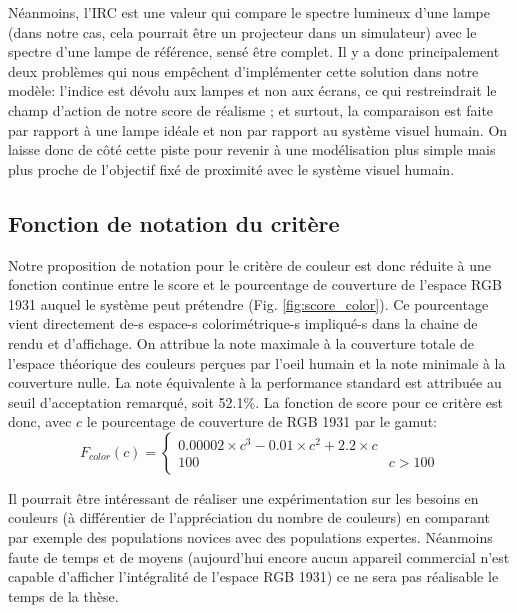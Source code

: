 	\par Néanmoins, l'IRC est une valeur qui compare le spectre lumineux d'une lampe (dans notre cas, cela pourrait être un projecteur dans un simulateur) avec le spectre d'une lampe de référence, sensé être complet. Il y a donc principalement deux problèmes qui nous empêchent d'implémenter cette solution dans notre modèle: l'indice est dévolu aux lampes et non aux écrans, ce qui restreindrait le champ d'action de notre score de réalisme ; et surtout, la comparaison est faite par rapport à une lampe idéale et non par rapport au système visuel humain. On laisse donc de côté cette piste pour revenir à une modélisation plus simple mais plus proche de l'objectif fixé de proximité avec le système visuel humain. 
	
	\subsection{Fonction de notation du critère}
	\par Notre proposition de notation pour le critère de couleur est donc réduite à une fonction continue entre le score et le pourcentage de couverture de l'espace RGB 1931 auquel le système peut prétendre (Fig. \ref{fig:score_color}). Ce pourcentage vient directement de-s espace-s colorimétrique-s impliqué-s dans la chaine de rendu et d'affichage. On attribue la note maximale à la couverture totale de l'espace théorique des couleurs perçues par l'oeil humain et la note minimale à la couverture nulle. La note équivalente à la performance standard est attribuée au seuil d'acceptation remarqué, soit 52.1\%. La fonction de score pour ce critère est donc, avec $c$ le pourcentage de couverture de RGB 1931 par le gamut:
	 \begin{equation}
		F_{color}(c) = \begin{cases}		
		0.00002 \times c^3 -0.01 \times c^2 + 2.2 \times c &\\
		100 & c > 100
		\end{cases}
		\label{eq:color}
	\end{equation}
	
	\par Il pourrait être intéressant de réaliser une expérimentation sur les besoins en couleurs (à différentier de l'appréciation du nombre de couleurs) en comparant par exemple des populations novices avec des populations expertes. Néanmoins faute de temps et de moyens (aujourd'hui encore aucun appareil commercial n'est capable d'afficher l'intégralité de l'espace RGB 1931) ce ne sera pas réalisable le temps de la thèse.
	
